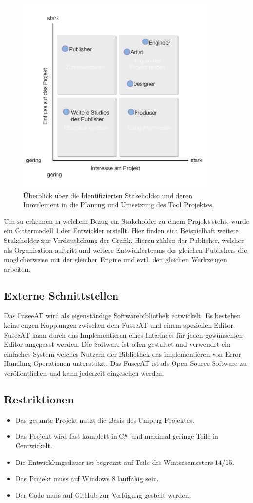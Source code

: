 \documentclass[pagesize, paper=a4, fontsize=12pt, titlepage=true, headings=small, headnosepline, abstractoff, liststotoc, nochapterprefix, plainheadsepline, twoside]{scrreprt}
\newcommand{\CSS}{C\texttt{\# }}
\newcommand{\CPP}{C\nolinebreak\hspace{-.05em}\raisebox{.4ex}{\tiny\bf +}\nolinebreak\hspace{-.10em}\raisebox{.4ex}{\tiny\bf +}}
\begin{document}
\begin{figure}[ht]
	\centering
	\includegraphics[width=10cm]{Bilder/Stakeholder_Diagramm.jpg}
	\caption{Überblick über die Identifizierten Stakeholder und deren Inovelement in die Planung und Umsetzung des Tool Projektes.}
	\label{StakeholderGrafik}
\end{figure}
Um zu erkennen in welchem Bezug ein Stakeholder zu einem Projekt steht, wurde ein Gittermodell \ref{StakeholderGrafik} der Entwickler erstellt. Hier finden sich Beispielhaft weitere Stakeholder zur Verdeutlichung der Grafik. Hierzu zählen der Publisher, welcher als Organisation auftritt und weitere Entwicklerteams des gleichen Publishers die möglicherweise mit der gleichen Engine und evtl. den gleichen Werkzeugen arbeiten.

\subsection{Externe Schnittstellen}
Das FuseeAT wird als eigenständige Softwarebibliothek entwickelt. Es bestehen keine engen Kopplungen zwischen dem FuseeAT und einem speziellen Editor. FuseeAT kann durch das Implementieren eines Interfaces für jeden gewünschten Editor angepasst werden. Die Software ist offen gestaltet und verwendet ein einfaches System welches Nutzern der Bibliothek das implementieren von Error Handling Operationen unterstützt. Das FuseeAT ist als Open Source Software zu veröffentlichen und kann jederzeit eingesehen werden.

\subsection{Restriktionen}
\begin{itemize}
\item Das gesamte Projekt nutzt die Basis des Uniplug Projektes.
\item Das Projekt wird fast komplett in \CSS und maximal geringe Teile in \CPP entwickelt.
\item Die Entwicklungsdauer ist begrenzt auf Teile des Wintersemesters 14/15.
\item Das Projekt muss auf Windows 8 lauffähig sein.
\item Der Code muss auf GitHub zur Verfügung gestellt werden.
\end{itemize}
\end{document}
